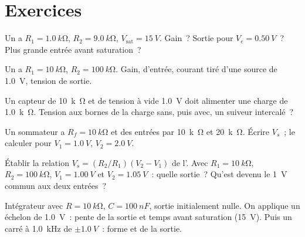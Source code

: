 \section{Exercices}

\begin{exercise}[$\star$]\label{exo:b1:operational-amplifier:1}
Un  a $R_1 = \qty{1.0}{k\ohm}$, $R_2 =
\qty{9.0}{k\ohm}$, $V_{\mathrm{sat}} = \qty{15}{V}$. Gain~? Sortie pour
$V_e = \qty{0.50}{V}$~? Plus grande entrée avant saturation~?
\end{exercise}

\begin{exercise}[$\star$]\label{exo:b1:operational-amplifier:2}
Un  a $R_1 = \qty{10}{k\ohm}$, $R_2 = \qty{100}{k\ohm}$.
Gain,  d'entrée, courant tiré d'une source de \qty{1.0}{V},
tension de sortie.
\end{exercise}

\begin{exercise}[$\star$]\label{exo:b1:operational-amplifier:3}
Un capteur de  \qty{10}{k\ohm} et de tension à vide
\qty{1.0}{V} doit alimenter une charge de \qty{1.0}{k\ohm}. Tension aux
bornes de la charge sans, puis avec, un suiveur intercalé~?
\end{exercise}

\begin{exercise}[$\star$]\label{exo:b1:operational-amplifier:4}
Un sommateur a $R_f = \qty{10}{k\ohm}$ et des entrées par
\qty{10}{k\ohm} et \qty{20}{k\ohm}. Écrire $V_s$~; le calculer pour
$V_1 = \qty{1.0}{V}$, $V_2 = \qty{2.0}{V}$.
\end{exercise}

\begin{exercise}[$\star\star$]\label{exo:b1:operational-amplifier:5}
Établir la relation $V_s = (R_2/R_1)(V_2 - V_1)$ de l'. Avec $R_1 = \qty{10}{k\ohm}$, $R_2 = \qty{100}{k\ohm}$,
$V_1 = \qty{1.00}{V}$ et $V_2 = \qty{1.05}{V}$~: quelle sortie~?
Qu'est devenu le \qty{1}{V} commun aux deux entrées~?
\end{exercise}

\begin{exercise}[$\star\star$]\label{exo:b1:operational-amplifier:6}
Intégrateur avec $R = \qty{10}{k\ohm}$, $C = \qty{100}{nF}$, sortie
initialement nulle. On applique un échelon de \qty{1.0}{V}~: pente de la
sortie et temps avant saturation (\qty{15}{V}). Puis un  carré à
\qty{1.0}{kHz} de $\pm\qty{1.0}{V}$~: forme et  de la sortie.
\end{exercise}

